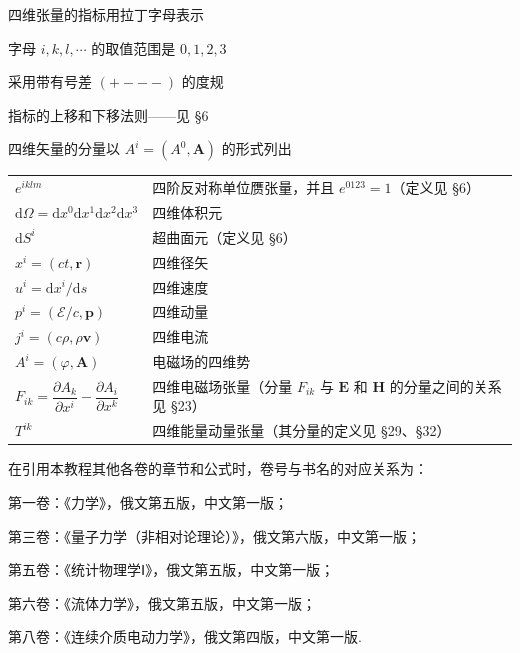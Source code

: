 \noindent 四维张量的指标用拉丁字母表示\par
\noindent 字母 $i,k,l,\cdots$ 的取值范围是 $0,1,2,3$\par
\noindent 采用带有号差 $(+---)$ 的度规\par
\noindent 指标的上移和下移法则——见 §6\par
\noindent 四维矢量的分量以 $A^{i}=(A^{0},\boldsymbol{A})$ 的形式列出\par
\medskip
\noindent
\begin{tabular}{@{}p{5.6cm}@{\qquad}p{9.2cm}@{}}
$e^{iklm}$ & 四阶反对称单位赝张量，并且 $e^{0123}=1$（定义见 §6） \\
$\mathrm{d}\Omega=\mathrm{d}x^{0}\mathrm{d}x^{1}\mathrm{d}x^{2}\mathrm{d}x^{3}$ & 四维体积元 \\
$\mathrm{d}S^{i}$ & 超曲面元（定义见 §6） \\
$x^{i}=(ct,\boldsymbol{r})$ & 四维径矢 \\
$u^{i}=\mathrm{d}x^{i}/\mathrm{d}s$ & 四维速度 \\
$p^{i}=(\mathcal{E}/c,\boldsymbol{p})$ & 四维动量 \\
$j^{i}=(c\rho,\rho\boldsymbol{v})$ & 四维电流 \\
$A^{i}=(\varphi,\boldsymbol{A})$ & 电磁场的四维势 \\
$F_{ik}=\dfrac{\partial A_{k}}{\partial x^{i}}-\dfrac{\partial A_{i}}{\partial x^{k}}$ &
  四维电磁场张量（分量 $F_{ik}$ 与 $\boldsymbol{E}$ 和 $\boldsymbol{H}$ 的分量之间的关系见 §23） \\
$T^{ik}$ & 四维能量动量张量（其分量的定义见 §29、§32） \\
\end{tabular}

\medskip
在引用本教程其他各卷的章节和公式时，卷号与书名的对应关系为：

第一卷：《力学》，俄文第五版，中文第一版；

第三卷：《量子力学（非相对论理论）》，俄文第六版，中文第一版；

第五卷：《统计物理学Ⅰ》，俄文第五版，中文第一版；

第六卷：《流体力学》，俄文第五版，中文第一版；

第八卷：《连续介质电动力学》，俄文第四版，中文第一版.
